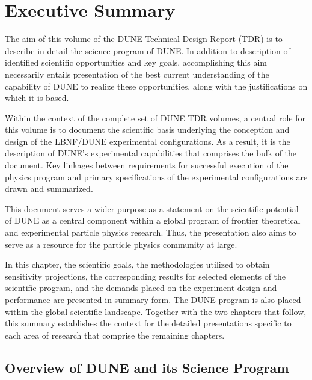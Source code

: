\chapter{Executive Summary}
\label{ch:exec-summ}

The aim of this volume of the DUNE Technical Design Report
(TDR) is to describe in detail the science program of DUNE.
In addition to description of identified scientific opportunities
and key goals, accomplishing this aim necessarily entails
presentation of the best current understanding
of the capability of DUNE to realize these opportunities,
along with the justifications on which it is based.

Within the context of the complete set of DUNE TDR volumes,
a central role for this volume is to document the scientific
basis underlying the conception and design of the LBNF/DUNE
experimental configurations.  As a result, it is the
description of DUNE's experimental capabilities that comprises
the bulk of the document.  Key linkages between requirements for
successful execution of the physics program and
primary specifications of the experimental configurations
are drawn and summarized.

This document serves a wider purpose as a statement on the
scientific potential of DUNE as a central component within
a global program of frontier theoretical and experimental
particle physics research. Thus, the presentation also
aims to serve as a resource for
the particle physics community at large.

In this chapter,
the scientific goals, the methodologies utilized to obtain
sensitivity projections, the corresponding results
for selected elements of the scientific program, and
the demands placed on the experiment design and performance
are presented in summary form.  The DUNE program is also
placed within the global scientific landscape.
Together with the two chapters that follow,
this summary establishes the context for the
detailed presentations specific to each area of
research that comprise the remaining chapters.


\section{Overview of DUNE and its Science Program}
\label{sec:exec-program-overview}

